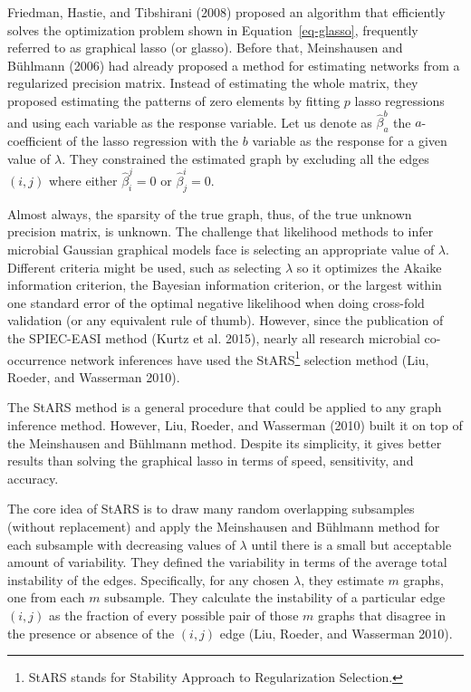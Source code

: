 \documentclass[
  a4paper,
]{article}
\begin{document}
Friedman, Hastie, and Tibshirani (2008) proposed an algorithm that
efficiently solves the optimization problem shown in
Equation~\ref{eq-glasso}, frequently referred to as graphical lasso (or
glasso). Before that, Meinshausen and Bühlmann (2006) had already
proposed a method for estimating networks from a regularized precision
matrix. Instead of estimating the whole matrix, they proposed estimating
the patterns of zero elements by fitting \(p\) lasso regressions and
using each variable as the response variable. Let us denote as
\(\hat\beta_a^b\) the \(a\)-coefficient of the lasso regression with the
\(b\) variable as the response for a given value of \(\lambda\). They
constrained the estimated graph by excluding all the edges \((i, j)\)
where either \(\hat\beta_i^j = 0\) or \(\hat\beta_j^i = 0\).

Almost always, the sparsity of the true graph, thus, of the true unknown
precision matrix, is unknown. The challenge that likelihood methods to
infer microbial Gaussian graphical models face is selecting an
appropriate value of \(\lambda\). Different criteria might be used, such
as selecting \(\lambda\) so it optimizes the Akaike information
criterion, the Bayesian information criterion, or the largest within one
standard error of the optimal negative likelihood when doing cross-fold
validation (or any equivalent rule of thumb). However, since the
publication of the SPIEC-EASI method (Kurtz et al. 2015), nearly all
research microbial co-occurrence network inferences have used the
StARS\footnote{StARS stands for Stability Approach to Regularization
  Selection.} selection method (Liu, Roeder, and Wasserman 2010).

The StARS method is a general procedure that could be applied to any
graph inference method. However, Liu, Roeder, and Wasserman (2010) built
it on top of the Meinshausen and Bühlmann method. Despite its
simplicity, it gives better results than solving the graphical lasso in
terms of speed, sensitivity, and accuracy.

The core idea of StARS is to draw many random overlapping subsamples
(without replacement) and apply the Meinshausen and Bühlmann method for
each subsample with decreasing values of \(\lambda\) until there is a
small but acceptable amount of variability. They defined the variability
in terms of the average total instability of the edges. Specifically,
for any chosen \(\lambda\), they estimate \(m\) graphs, one from each
\(m\) subsample. They calculate the instability of a particular edge
\((i, j)\) as the fraction of every possible pair of those \(m\) graphs
that disagree in the presence or absence of the \((i, j)\) edge (Liu,
Roeder, and Wasserman 2010).
\end{document}
